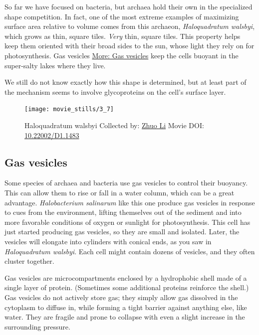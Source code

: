 \documentclass[]{tufte-book}
\begin{document}
So far we have focused on bacteria, but archaea hold their own in the
specialized shape competition. In fact, one of the most extreme examples
of maximizing surface area relative to volume comes from this archaeon,
\emph{Haloquadratum walsbyi}, which grows as thin, square tiles.
\emph{Very} thin, square tiles. This property helps keep them oriented
with their broad sides to the sun, whose light they rely on for
photosynthesis. Gas vesicles \protect\hyperlink{Gas_vesicles}{More: Gas
vesicles} keep the cells buoyant in the super-salty lakes where they
live.

We still do not know exactly how this shape is determined, but at least
part of the mechanism seems to involve glycoproteins on the cell's
surface layer.





\begin{figure}
\texttt{[image: movie\_stills/3\_7]} \caption[Haloquadratum walsbyi Collected by:
\protect\hyperlink{zhuo_li}{Zhuo Li} Movie DOI:
\href{https://doi.org/10.22002/D1.1483}{10.22002/D1.1483}]{Haloquadratum walsbyi Collected by:
\protect\hyperlink{zhuo_li}{Zhuo Li} Movie DOI:
\href{https://doi.org/10.22002/D1.1483}{10.22002/D1.1483}}\label{fig:3-7}
\end{figure}

\hypertarget{Gas_vesicles}{\subsection{Gas
vesicles}\label{Gas_vesicles}}

Some species of archaea and bacteria use gas vesicles to control their
buoyancy. This can allow them to rise or fall in a water column, which
can be a great advantage. \emph{Halobacterium salinarum} like this one
produce gas vesicles in response to cues from the environment, lifting
themselves out of the sediment and into more favorable conditions of
oxygen or sunlight for photosynthesis. This cell has just started
producing gas vesicles, so they are small and isolated. Later, the
vesicles will elongate into cylinders with conical ends, as you saw in
\emph{Haloquadratum walsbyi}. Each cell might contain dozens of
vesicles, and they often cluster together.

Gas vesicles are microcompartments enclosed by a hydrophobic shell made
of a single layer of protein. (Sometimes some additional proteins
reinforce the shell.) Gas vesicles do not actively store gas; they
simply allow gas dissolved in the cytoplasm to diffuse in, while forming
a tight barrier against anything else, like water. They are fragile and
prone to collapse with even a slight increase in the surrounding
pressure.
\end{document}
